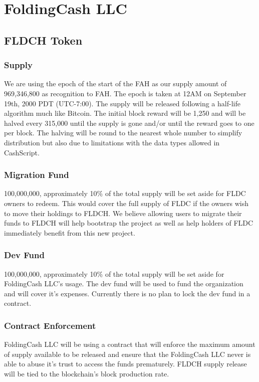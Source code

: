 \documentclass[letterpaper,12pt,titlepage]{article}
\def\org{FoldingCash LLC}
\def\ticker{FLDCH}
\def\tokenSupply{969,346,800}
\def\initReward{1,250}
\def\halvingLength{315,000}
\def\devfund{100,000,000}
\def\migrationFund{100,000,000}
\def\fahLaunchEpoch{12AM on September 19th, 2000 PDT (UTC-7:00)}
\begin{document}
\section{\org{}}

\subsection{\ticker{} Token}

\subsubsection{Supply}
We are using the epoch of the start of the FAH as our supply amount of \tokenSupply{} as recognition to FAH. The epoch is taken at \fahLaunchEpoch{}. The supply will be released following a half-life algorithm much like Bitcoin. The initial block reward will be \initReward{} and will be halved every \halvingLength{} until the supply is gone and/or until the reward goes to one per block. The halving will be round to the nearest whole number to simplify distribution but also due to limitations with the data types allowed in CashScript.

\subsubsection{Migration Fund}
\migrationFund{}, approximately 10\% of the total supply will be set aside for FLDC owners to redeem. This would cover the full supply of FLDC if the owners wish to move their holdings to \ticker{}. We believe allowing users to migrate their funds to \ticker{} will help bootstrap the project as well as help holders of FLDC immediately benefit from this new project.

\subsubsection{Dev Fund}
\devfund{}, approximately 10\% of the total supply will be set aside for \org{'s} usage. The dev fund will be used to fund the organization and will cover it's expenses. Currently there is no plan to lock the dev fund in a contract.

\subsubsection{Contract Enforcement}
\org{} will be using a contract that will enforce the maximum amount of supply available to be released and ensure that the \org{} never is able to abuse it's trust to access the funds prematurely. \ticker{} supply release will be tied to the blockchain's block production rate. 
\end{document}
